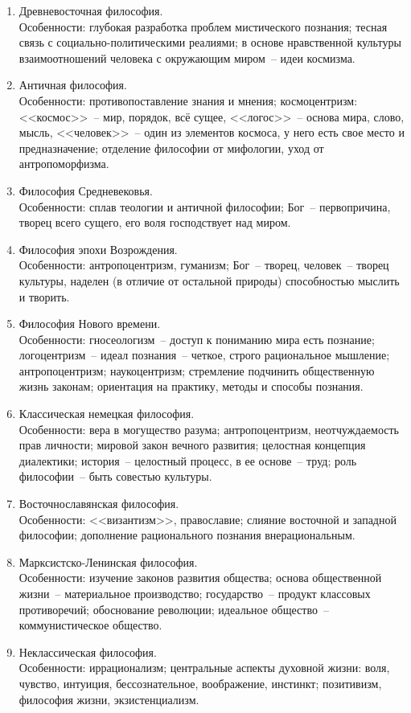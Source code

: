 \begin{enumerate}
    \item Древневосточная философия.\\
        Особенности: глубокая разработка проблем мистического познания;
        тесная связь с социально-политическими реалиями;
        в основе нравственной культуры взаимоотношений человека с окружающим миром~-- идеи космизма.
    \item Античная философия.\\
        Особенности: противопоставление знания и мнения;
        космоцентризм: <<космос>>~-- мир, порядок, всё сущее, <<логос>>~-- основа мира, слово, мысль,
        <<человек>>~-- один из элементов космоса, у него есть свое место и предназначение;
        отделение философии от мифологии, уход от антропоморфизма.
    \item Философия Средневековья.\\
        Особенности: сплав теологии и античной философии;
        Бог~-- первопричина, творец всего сущего, его воля господствует над миром.
    \item Философия эпохи Возрождения.\\
        Особенности: антропоцентризм, гуманизм;
        Бог~-- творец, человек~-- творец культуры, наделен (в отличие от остальной природы) способностью
        мыслить и творить.
    \item Философия Нового времени.\\
        Особенности: гносеологизм~-- доступ к пониманию мира есть познание;
        логоцентризм~-- идеал познания~-- четкое, строго рациональное мышление;
        антропоцентризм;
        наукоцентризм;
        стремление подчинить общественную жизнь законам;
        ориентация на практику, методы и способы познания.
    \item Классическая немецкая философия.\\
        Особенности: вера в могущество разума;
        антропоцентризм, неотчуждаемость прав личности;
        мировой закон вечного развития;
        целостная концепция диалектики;
        история~-- целостный процесс, в ее основе~-- труд;
        роль философии~-- быть совестью культуры.
    \item Восточнославянская философия.\\
        Особенности:
        <<византизм>>, православие;
        слияние восточной и западной философии;
        дополнение рационального познания внерациональным.
    \item Марксистско-Ленинская философия.\\
        Особенности: изучение законов развития общества;
        основа общественной жизни~-- материальное производство;
        государство~-- продукт классовых противоречий;
        обоснование революции;
        идеальное общество~-- коммунистическое общество.
    \item Неклассическая философия.\\
        Особенности: иррационализм;
        центральные аспекты духовной жизни: воля, чувство, интуиция, бессознательное, воображение,
        инстинкт;
        позитивизм, философия жизни, экзистенциализм.
\end{enumerate}
